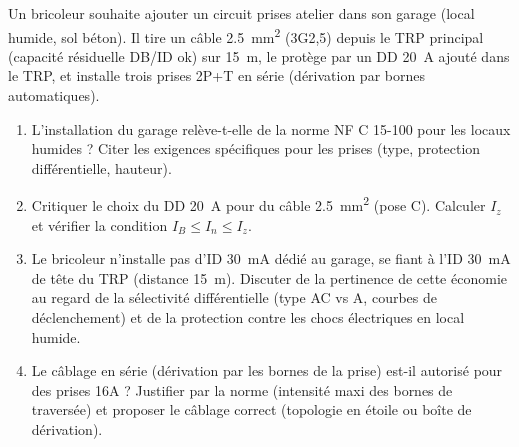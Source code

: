 \documentclass[11pt]{article}
\begin{document}
\begin{exercice}
Un bricoleur souhaite ajouter un circuit \og prises atelier \fg dans son garage (local humide, sol béton). Il tire un câble \SI{2,5}{mm^2} (3G2,5) depuis le TRP principal (capacité résiduelle DB/ID ok) sur \SI{15}{m}, le protège par un DD \SI{20}{A} ajouté dans le TRP, et installe trois prises 2P+T en série (dérivation par bornes automatiques).
\begin{enumerate}
    \item L'installation du garage relève-t-elle de la norme NF C 15-100 pour les locaux humides ? Citer les exigences spécifiques pour les prises (type, protection différentielle, hauteur).
    \item Critiquer le choix du DD \SI{20}{A} pour du câble \SI{2,5}{mm^2} (pose C). Calculer $I_z$ et vérifier la condition $I_B \le I_n \le I_z$.
    \item Le bricoleur n'installe pas d'ID \SI{30}{mA} dédié au garage, se fiant à l'ID \SI{30}{mA} de tête du TRP (distance \SI{15}{m}). Discuter de la pertinence de cette économie au regard de la sélectivité différentielle (type AC vs A, courbes de déclenchement) et de la protection contre les chocs électriques en local humide.
    \item Le câblage en \og série \fg (dérivation par les bornes de la prise) est-il autorisé pour des prises 16A ? Justifier par la norme (intensité maxi des bornes de traversée) et proposer le câblage correct (topologie en étoile ou boîte de dérivation).
\end{enumerate}
\end{exercice}
\end{document}
